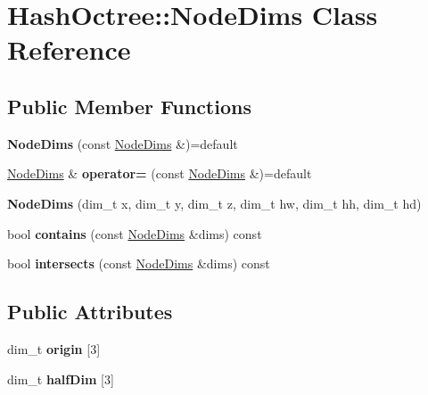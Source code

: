\hypertarget{class_hash_octree_1_1_node_dims}{}\section{Hash\+Octree\+::Node\+Dims Class Reference}
\label{class_hash_octree_1_1_node_dims}
\subsection*{Public Member Functions}
\begin{DoxyCompactItemize}
\item 
\mbox{\label{class_hash_octree_1_1_node_dims_ab75263135e8d6c34e62e0cd6aceadc2c}} 
{\bfseries Node\+Dims} (const \mbox{\hyperlink{class_hash_octree_1_1_node_dims}{Node\+Dims}} \&)=default
\item 
\mbox{\label{class_hash_octree_1_1_node_dims_a6da88e1efa618867cff694715b8ffeaf}} 
\mbox{\hyperlink{class_hash_octree_1_1_node_dims}{Node\+Dims}} \& {\bfseries operator=} (const \mbox{\hyperlink{class_hash_octree_1_1_node_dims}{Node\+Dims}} \&)=default
\item 
\mbox{\label{class_hash_octree_1_1_node_dims_a7f941db27686a666752ba731401c5eb5}} 
{\bfseries Node\+Dims} (dim\+\_\+t x, dim\+\_\+t y, dim\+\_\+t z, dim\+\_\+t hw, dim\+\_\+t hh, dim\+\_\+t hd)
\item 
\mbox{\label{class_hash_octree_1_1_node_dims_adab75d3617e77d9938683d3869c21062}} 
bool {\bfseries contains} (const \mbox{\hyperlink{class_hash_octree_1_1_node_dims}{Node\+Dims}} \&dims) const
\item 
\mbox{\label{class_hash_octree_1_1_node_dims_a7bea3ae22661de4d297e9d29eeae6725}} 
bool {\bfseries intersects} (const \mbox{\hyperlink{class_hash_octree_1_1_node_dims}{Node\+Dims}} \&dims) const
\end{DoxyCompactItemize}
\subsection*{Public Attributes}
\begin{DoxyCompactItemize}
\item 
\mbox{\label{class_hash_octree_1_1_node_dims_a8b6c6b85c888dbdbf82381131ccfec12}} 
dim\+\_\+t {\bfseries origin} \mbox{[}3\mbox{]}
\item 
\mbox{\label{class_hash_octree_1_1_node_dims_a7eb3cb7a39ddb10211f623cb48105604}} 
dim\+\_\+t {\bfseries half\+Dim} \mbox{[}3\mbox{]}
\end{DoxyCompactItemize}


